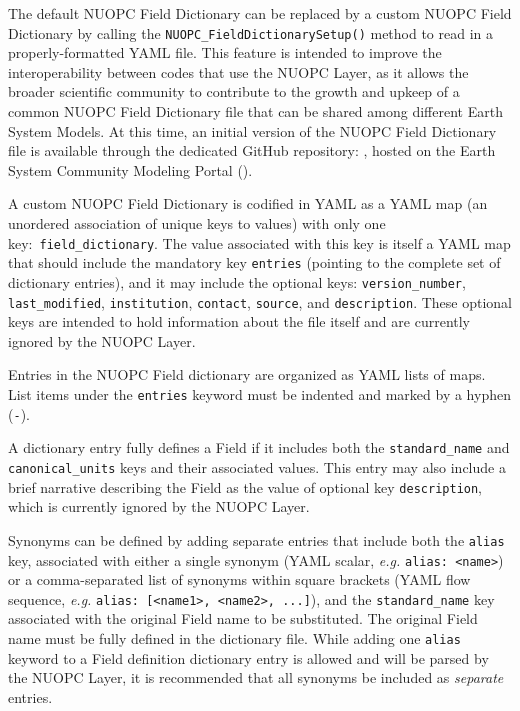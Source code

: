 The default NUOPC Field Dictionary can be replaced by a custom NUOPC Field Dictionary by calling the {\tt NUOPC\_FieldDictionarySetup()} method to read in a properly-formatted YAML file. This feature is intended to improve the interoperability between codes that use the NUOPC Layer, as it allows the broader scientific community to contribute to the growth and upkeep of a common NUOPC Field Dictionary file that can be shared among different Earth System Models. At this time, an initial version of the NUOPC Field Dictionary file is available through the dedicated GitHub repository: , hosted on the Earth System Community Modeling Portal ().

A custom NUOPC Field Dictionary is codified in YAML as a YAML map (an unordered association of unique keys to values) with only one key:~{\tt field\_dictionary}. The value associated with this key is itself a YAML map that should include the mandatory key {\tt entries} (pointing to the complete set of dictionary entries), and it may include the optional keys: {\tt version\_number}, {\tt last\_modified}, {\tt institution}, {\tt contact}, {\tt source}, and {\tt description}. These optional keys are intended to hold information about the file itself and are currently ignored by the NUOPC Layer.

Entries in the NUOPC Field dictionary are organized as YAML lists of maps. List items under the {\tt entries} keyword must be indented and marked by a hyphen ({\tt -}).

A dictionary entry fully defines a Field if it includes both the {\tt standard\_name} and {\tt canonical\_units} keys and their associated values. This entry may also include a brief narrative describing the Field as the value of optional key {\tt description}, which is currently ignored by the NUOPC Layer.

Synonyms can be defined by adding separate entries that include both the {\tt alias} key, associated with either a single synonym (YAML scalar, {\it e.g.\/} {\tt alias:~<name>}) or a comma-separated list of synonyms within square brackets (YAML flow sequence, {\it e.g.\/} {\tt alias:~[<name1>, <name2>, ...]}), and the {\tt standard\_name} key associated with the original Field name to be substituted. The original Field name must be fully defined in the dictionary file. While adding one {\tt alias} keyword to a Field definition dictionary entry is allowed and will be parsed by the NUOPC Layer, it is recommended that all synonyms be included as {\it separate} entries.

